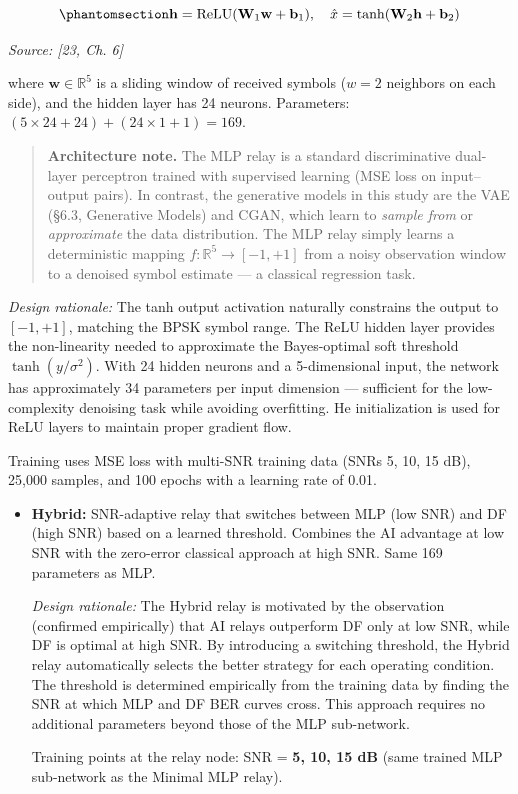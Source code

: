 \begin{equation}\protect\phantomsection\label{eq:mlp-relay}{\mathbf{h} = \text{ReLU}(\mathbf{W}_1 \mathbf{w} + \mathbf{b}_1), \quad \hat{x} = \tanh(\mathbf{W}_2 \mathbf{h} + \mathbf{b}_2)
}\end{equation} \par{\small\textit{Source: [23, Ch. 6]}}

where \(\mathbf{w} \in \mathbb{R}^5\) is a sliding window of received symbols (\(w=2\) neighbors on each side), and the hidden layer has 24 neurons. Parameters: \((5 \times 24 + 24) + (24 \times 1 + 1) = 169\).

\begin{quote}
\textbf{Architecture note.} The MLP relay is a standard discriminative dual-layer perceptron trained with supervised learning (MSE loss on input--output pairs). In contrast, the generative models in this study are the VAE (§6.3, Generative Models) and CGAN, which learn to \emph{sample from} or \emph{approximate} the data distribution. The MLP relay simply learns a deterministic mapping \(f: \mathbb{R}^5 \to [-1,+1]\) from a noisy observation window to a denoised symbol estimate --- a classical regression task.
\end{quote}

\emph{Design rationale:} The tanh output activation naturally constrains the output to \([-1, +1]\), matching the BPSK symbol range. The ReLU hidden layer provides the non-linearity needed to approximate the Bayes-optimal soft threshold \(\tanh(y/\sigma^2)\). With 24 hidden neurons and a 5-dimensional input, the network has approximately 34 parameters per input dimension --- sufficient for the low-complexity denoising task while avoiding overfitting. He initialization is used for ReLU layers to maintain proper gradient flow.

Training uses MSE loss with multi-SNR training data (SNRs 5, 10, 15 dB), 25,000 samples, and 100 epochs with a learning rate of 0.01.

\begin{itemize}
\item
  \textbf{Hybrid:} SNR-adaptive relay that switches between MLP (low SNR) and DF (high SNR) based on a learned threshold. Combines the AI advantage at low SNR with the zero-error classical approach at high SNR. Same 169 parameters as MLP.

  \emph{Design rationale:} The Hybrid relay is motivated by the observation (confirmed empirically) that AI relays outperform DF only at low SNR, while DF is optimal at high SNR. By introducing a switching threshold, the Hybrid relay automatically selects the better strategy for each operating condition. The threshold is determined empirically from the training data by finding the SNR at which MLP and DF BER curves cross. This approach requires no additional parameters beyond those of the MLP sub-network.

  Training points at the relay node: SNR = \textbf{5, 10, 15 dB} (same trained MLP sub-network as the Minimal MLP relay).
\end{itemize}

